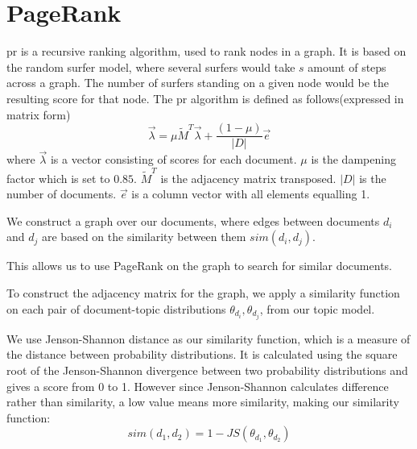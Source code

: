 \section{PageRank}\label{sec:pagerank}
\gls{pr} is a recursive ranking algorithm, used to rank nodes in a graph.
It is based on the random surfer model, where several surfers would take $s$ amount of steps across a graph.
The number of surfers standing on a given node would be the resulting score for that node.
The \gls{pr} algorithm is defined as follows(expressed in matrix form)
$$ \overrightarrow{\lambda} = \mu \widetilde{M}^T \overrightarrow{\lambda} + \frac{(1-\mu)}{|D|} \overrightarrow{e} $$  
where $\overrightarrow{\lambda}$ is a vector consisting of scores for each document. 
$\mu$ is the dampening factor which is set to $0.85$.
$\widetilde{M}^T$ is the adjacency matrix transposed.
$|D|$ is the number of documents.
$\overrightarrow{e}$ is a column vector with all elements equalling 1.

We construct a graph over our documents, where edges between documents $d_i$ and $d_j$ are based on the similarity between them $sim(d_i, d_j)$.

This allows us to use PageRank on the graph to search for similar documents.

To construct the adjacency matrix for the graph, we apply a similarity function on each pair of document-topic distributions $\theta_{d_i}, \theta_{d_j}$, from our topic model.

We use Jenson-Shannon distance as our similarity function, which is a measure of the distance between probability distributions\cite{jensen-shannon2003}\cite{jensen-shannondis2003}.
It is calculated using the square root of the Jenson-Shannon divergence between two probability distributions and gives a score from 0 to 1.
However since Jenson-Shannon calculates difference rather than similarity, a low value means more similarity, making our similarity function:
$$sim(d_1, d_2) = 1 - JS(\theta_{d_1}, \theta_{d_2})$$

